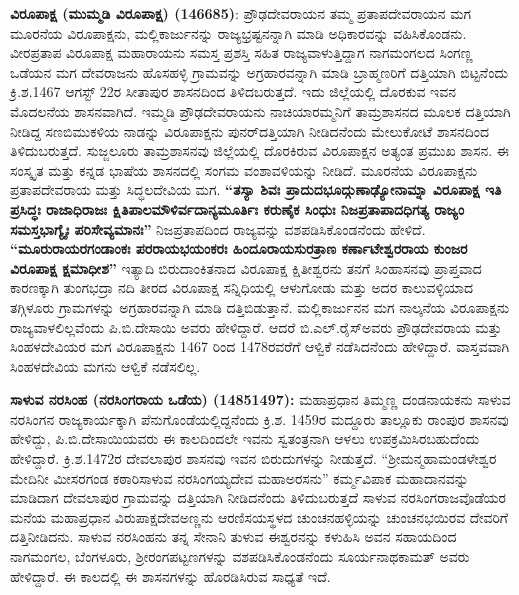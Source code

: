 \textbf{ ವಿರೂಪಾಕ್ಷ (ಮುಮ್ಮಡಿ ವಿರೂಪಾಕ್ಷ) (146685)}: ಪ್ರೌಢದೇವರಾಯನ ತಮ್ಮ ಪ್ರತಾಪದೇವರಾಯನ ಮಗ ಮೂರನೆಯ ವಿರೂಪಾಕ್ಷನು, ಮಲ್ಲಿಕಾರ್ಜುನನ್ನು ರಾಜ್ಯಭ್ರಷ್ಟನನ್ನಾಗಿ ಮಾಡಿ ಅಧಿಕಾರವನ್ನು ವಹಿಸಿಕೊಂಡನು. ವೀರಪ್ರತಾಪ ವಿರೂಪಾಕ್ಷ ಮಹಾರಾಯನು ಸಮಸ್ತ ಪ್ರಶಸ್ತಿ ಸಹಿತ ರಾಜ್ಯವಾಳುತ್ತಿದ್ದಾಗ ನಾಗಮಂಗಲದ ಸಿಂಗಣ್ಣ ಒಡೆಯನ ಮಗ ದೇವರಾಜನು ಹೊಸಹಳ್ಳಿ ಗ್ರಾಮವನ್ನು ಅಗ್ರಹಾರವನ್ನಾಗಿ ಮಾಡಿ ಬ್ರಾಹ್ಮಣರಿಗೆ ದತ್ತಿಯಾಗಿ ಬಿಟ್ಟನೆಂದು ಕ್ರಿ.ಶ.1467 ಆಗಸ್ಟ್​ 22ರ ಸೀತಾಪುರ ಶಾಸನದಿಂದ ತಿಳಿದಬರುತ್ತದೆ. ಇದು ಜಿಲ್ಲೆಯಲ್ಲಿ ದೊರಕುವ ಇವನ ಮೊದಲನೆಯ ಶಾಸನವಾಗಿದೆ. ಇಮ್ಮಡಿ ಪ್ರೌಢದೇವರಾಯನು ನಾಚಿಯಾರಮ್ಮನಿಗೆ ತಾಮ್ರಶಾಸನದ ಮೂಲಕ ದತ್ತಿಯಾಗಿ ನೀಡಿದ್ದ ಸಣಬಿಮುಕಳಿಯ ನಾಡನ್ನು ವಿರೂಪಾಕ್ಷನು ಪುನರ್​ದತ್ತಿಯಾಗಿ ನೀಡಿದನೆಂದು ಮೇಲುಕೋಟೆ ಶಾಸನದಿಂದ ತಿಳಿದುಬರುತ್ತದೆ. ಸುಜ್ಜಲೂರು ತಾಮ್ರಶಾಸನವು ಜಿಲ್ಲೆಯಲ್ಲಿ ದೊರಕಿರುವ ವಿರೂಪಾಕ್ಷನ ಅತ್ಯಂತ ಪ್ರಮುಖ ಶಾಸನ. ಈ ಸಂಸ್ಕೃತ ಮತ್ತು ಕನ್ನಡ ಭಾಷೆಯ ಶಾಸನದಲ್ಲಿ ಸಂಗಮ ವಂಶಾವಳಿಯನ್ನು ನೀಡಿದೆ. ಮೂರನೆಯ ವಿರೂಪಾಕ್ಷನು ಪ್ರತಾಪದೇವರಾಯ ಮತ್ತು ಸಿದ್ಧಲದೇವಿಯ ಮಗ. \textbf{“ತಸ್ಯಾ ಶಿವಃ ಪ್ರಾದುದಭೂದ್ಗುಣಾಢ್ಯೋನಾಮ್ನಾ ವಿರೂಪಾಕ್ಷ ಇತಿ ಪ್ರಸಿದ್ಧಃ ರಾಜಾಧಿರಾಜಃ ಕ್ಷಿತಿಪಾಲಮೌಳಿರ್ವದಾನ್ಯಮೂರ್ತಿಃ ಕರುಣೈಕ ಸಿಂಧುಃ ನಿಜಪ್ರತಾಪಾದಧಿಗತ್ಯ ರಾಜ್ಯಂ ಸಮಸ್ತಭಾಗ್ಯೈಃ ಪರಿಸೇವ್ಯಮಾನಃ”} ನಿಜಪ್ರತಾಪದಿಂದ ರಾಜ್ಯವನ್ನು ವಶಪಡಿಸಿಕೊಂಡನೆಂದು ಹೇಳಿದೆ. \textbf{“ಮೂರುರಾಯರಗಂಡಾಂಕಃ ಪರರಾಯಭಯಂಕರಃ ಹಿಂದೂರಾಯಸುರತ್ರಾಣ ಕರ್ಣಾಟೇಶ್ವರರಾಯ ಕುಂಜರ ವಿರೂಪಾಕ್ಷ ಕ್ಷಮಾಧೀಶ”} ಇತ್ಯಾದಿ ಬಿರುದಾಂಕಿತನಾದ ವಿರೂಪಾಕ್ಷ ಕ್ಷಿತೀಶ್ವರನು ತನಗೆ ಸಿಂಹಾಸನವು ಪ್ರಾಪ್ತವಾದ ಕಾರಣಕ್ಕಾಗಿ ತುಂಗಭದ್ರಾ ನದಿ ತೀರದ ವಿರೂಪಾಕ್ಷ ಸನ್ನಿಧಿಯಲ್ಲಿ ಆಳುಗೋಡು ಮತ್ತು ಅದರ ಕಾಲುವಳ್ಳಿಯಾದ ತಗ್ಗಿಳೂರು ಗ್ರಾಮಗಳನ್ನು ಅಗ್ರಹಾರವನ್ನಾಗಿ ಮಾಡಿ ದತ್ತಿಬಿಡುತ್ತಾನೆ. ಮಲ್ಲಿಕಾರ್ಜುನನ ಮಗ ನಾಲ್ಕನೆಯ ವಿರೂಪಾಕ್ಷನು ರಾಜ್ಯವಾಳಲಿಲ್ಲವೆಂದು ಪಿ.ಬಿ.ದೇಸಾಯಿ ಅವರು ಹೇಳಿದ್ದಾರೆ. ಆದರೆ ಬಿ.ಎಲ್​.ರೈಸ್​ ಅವರು ಪ್ರೌಢದೇವರಾಯ ಮತ್ತು ಸಿಂಹಳದೇವಿಯರ ಮಗ ವಿರೂಪಾಕ್ಷನು 1467 ರಿಂದ 1478ರವರೆಗೆ ಆಳ್ವಿಕೆ ನಡೆಸಿದನೆಂದು ಹೇಳಿದ್ದಾರೆ. ವಾಸ್ತವವಾಗಿ ಸಿಂಹಳದೇವಿಯ ಮಗನು ಆಳ್ವಿಕೆ ನಡೆಸಲಿಲ್ಲ.

\textbf{ ಸಾಳುವ ನರಸಿಂಹ (ನರಸಿಂಗರಾಯ ಒಡೆಯ) (14851497):} ಮಹಾಪ್ರಧಾನ ತಿಮ್ಮಣ್ಣ ದಂಡನಾಯಕನು ಸಾಳುವ ನರಸಿಂಗನ ರಾಜ್ಯಕಾರ್ಯಕ್ಕಾಗಿ ಪೆನುಗೊಂಡೆಯಲ್ಲಿದ್ದನೆಂದು ಕ್ರಿ.ಶ. 1459ರ ಮದ್ದೂರು ತಾಲ್ಲೂಕು ರಾಂಪುರ ಶಾಸನವು ಹೇಳಿದ್ದು, ಪಿ.ಬಿ.ದೇಸಾಯಿಯವರು ಈ ಕಾಲದಿಂದಲೇ ಇವನು ಸ್ವತಂತ್ರನಾಗಿ ಆಳಲು ಉಪಕ್ರಮಿಸಿರಬಹುದೆಂದು ಹೇಳಿದ್ದಾರೆ. ಕ್ರಿ.ಶ.1472ರ ದೇವಲಾಪುರ ಶಾಸನವು ಇವನ ಬಿರುದುಗಳನ್ನು ನೀಡುತ್ತದೆ. “ಶ‍್ರೀಮನ್ಮಹಾಮಂಡಳೇಶ್ವರ ಮೇದಿನೀ ಮೀಸರಗಂಡ ಕಠಾರಿಸಾಳುವ ನರಸಿಂಗಯ್ಯದೇವ ಮಹಾಅರಸನು” ಕರ್ಮ್ಮವಿಪಾಕ ಮಹಾದಾನವನ್ನು ಮಾಡಿದಾಗ ದೇವಲಾಪುರ ಗ್ರಾಮವನ್ನು ದತ್ತಿಯಾಗಿ ನೀಡಿದನೆಂದು ತಿಳಿದುಬರುತ್ತದೆ ಸಾಳುವ ನರಸಿಂಗರಾಜವೊಡೆಯರ ಮನೆಯ ಮಹಾಪ್ರಧಾನ ವಿರುಪಾಕ್ಷದೇವಅಣ್ಣನು ಆರಣಿಸಯಸ್ಥಳದ ಚುಂಚನಹಳ್ಳಿಯನ್ನು ಚುಂಚನಭಯಿರವ ದೇವರಿಗೆ ದತ್ತಿ\break ನೀಡಿದನು. ಸಾಳುವ ನರಸಿಂಹನು ತನ್ನ ಸೇನಾನಿ ತುಳುವ ಈಶ್ವರನನ್ನು ಕಳುಹಿಸಿ ಅವನ ಸಹಾಯದಿಂದ ನಾಗಮಂಗಲ, ಬೆಂಗಳೂರು, ಶ‍್ರೀರಂಗಪಟ್ಟಣಗಳನ್ನು ವಶಪಡಿಸಿಕೊಂಡನೆಂದು ಸೂರ್ಯನಾಥಕಾಮತ್​ ಅವರು ಹೇಳಿದ್ದಾರೆ. ಈ ಕಾಲದಲ್ಲಿ ಈ ಶಾಸನಗಳನ್ನು ಹೊರಡಿಸಿರುವ ಸಾಧ್ಯತೆ ಇದೆ. 

